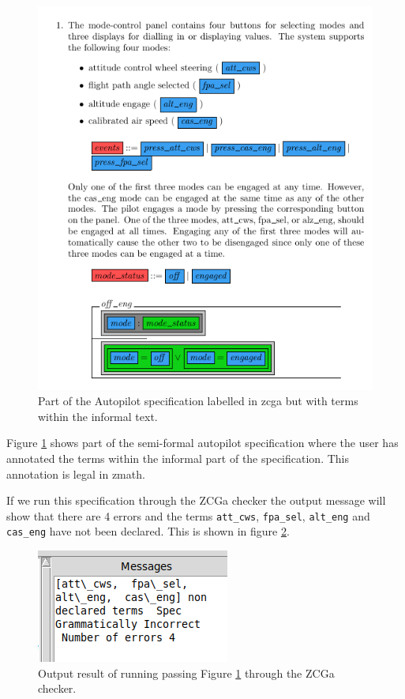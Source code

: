 \begin{figure}[H]
    \centering
    \includegraphics[scale=0.6]{Figures/zcga/semiformZcgaIncorrect.png}
    \caption{Part of the Autopilot specification labelled in
     \gls{zcga} but with terms within the informal text. \label{fig:zcgautopilotzcgaincorrect}}
    \end{figure}

Figure \ref{fig:zcgautopilotzcgaincorrect} shows part of the semi-formal autopilot
specification where the user has annotated the terms within the informal part of
the specification. This annotation is legal in \gls{zmath}.

If we run this specification through the ZCGa checker the output message will
show that there are 4 errors and the terms \texttt{att\_cws}, \texttt{fpa\_sel},
\texttt{alt\_eng} and \texttt{cas\_eng} have not been declared. This is shown in
figure \ref{fig:zcgaautopilotresult}.

\begin{figure}[H]
    \centering
    \includegraphics[scale=0.5]{Figures/zcga/semiformsmessage.png}
    \caption{Output result of running passing Figure \ref{fig:zcgautopilotzcgaincorrect} 
    through the ZCGa checker. \label{fig:zcgaautopilotresult}}
\end{figure}

